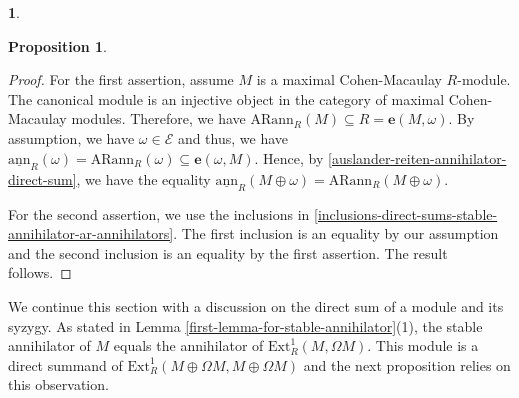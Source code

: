 \documentclass[12pt]{amsart}
\newcommand{\Ext}{\mathrm{Ext}}
\newcommand{\sann}{\underline{\mathrm{ann}}}
\newcommand{\arann}{\mathrm{ARann}}
\newcommand{\EE}{\mathcal{E}}
\newtheorem{proposition}[theorem]{Proposition}
\theoremstyle{definition}
\newtheorem{chunk}[theorem]{}
\numberwithin{equation}{theorem}
\def\e{\boldsymbol{e}}
\begin{document}
\begin{chunk}
\begin{proposition}
    \end{proposition}
    \begin{proof}
        For the first assertion, assume $M$ is a maximal Cohen-Macaulay $R$-module. The canonical module is an injective object in the category of maximal Cohen-Macaulay modules. Therefore, we have $\arann_R(M) \subseteq R = \e(M, \omega)$. By assumption, we have $\omega \in \EE$ and thus, we have $\sann_R(\omega) = \arann_R(\omega) \subseteq \e(\omega, M)$. Hence, by \ref{auslander-reiten-annihilator-direct-sum}, we have the equality $\sann_R(M \oplus \omega)= \arann_R(M \oplus \omega)$.

        For the second assertion, we use the inclusions in \ref{inclusions-direct-sums-stable-annihilator-ar-annihilators}. The first inclusion is an equality by our assumption and the second inclusion is an equality by the first assertion. The result follows. 
    \end{proof}
    We continue this section with a discussion on the direct sum of a module and its syzygy. As stated in Lemma \ref{first-lemma-for-stable-annihilator}(1), the stable annihilator of $M$ equals the annihilator of $\Ext_R^1(M, \Omega M)$. This module is a direct summand of $\Ext_R^1(M \oplus \Omega M, M \oplus \Omega M)$ and the next proposition relies on this observation.


\end{chunk}
\end{document}
